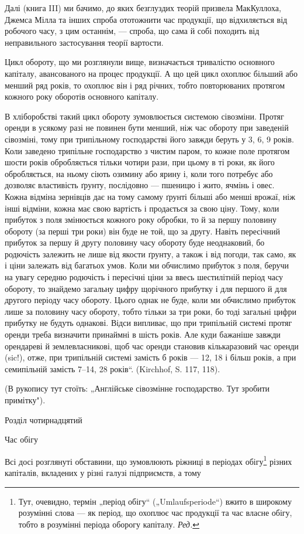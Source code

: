 Далі (книга III) ми бачимо, до яких безглуздих теорій призвела МакКуллоха,
Джемса Мілла та інших спроба ототожнити час продукції, що відхиляється від робочого часу, з
цим останнім, — спроба, що сама й собі походить від неправильного застосування теорії вартости.

Цикл обороту, що ми розглянули вище, визначається тривалістю основного капіталу, авансованого на
процес продукції. А що цей цикл охоплює більший або менший ряд років, то охоплює він і ряд річних,
тобто повторюваних протягом кожного року оборотів основного капіталу.

В хліборобстві такий цикл обороту зумовлюється системою сівозміни. Протяг оренди в усякому разі не
повинен бути менший, ніж час обороту при заведеній сівозміні, тому при трипільному господарстві його
завжди беруть у 3, 6, 9 років. Коли заведено трипільне господарство з чистим паром, то кожне поле
протягом шости років обробляється тільки чотири рази, при цьому в ті роки, як його обробляється, на
ньому сіють озимину або ярину і, коли того потребує або дозволяє властивість ґрунту, послідовно —
пшеницю і жито, ячмінь і овес. Кожна відміна зернівців дає на тому самому ґрунті більші або менші
врожаї, ніж інші відміни, кожна має свою вартість і продається за свою ціну. Тому, коли прибуток з
поля змінюється кожного року обробки, то й за першу половину обороту (за перші три роки) він буде не
той, що за другу. Навіть пересічний прибуток за першу й другу половину часу обороту буде
неоднаковий, бо родючість залежить не лише від якости ґрунту, а також і від погоди, так само, як і
ціни залежать від багатьох умов. Коли ми обчислимо прибуток з поля, беручи на увагу середню
родючість і пересічні ціни за ввесь шестилітній період часу обороту, то знайдемо загальну цифру
щорічного прибутку і для першого й для другого періоду часу обороту. Цього однак не буде, коли ми
обчислимо прибуток лише за половину часу обороту, тобто тільки за три роки, бо тоді загальні цифри
прибутку не будуть однакові. Відси випливає, що при трипільній системі протяг оренди треба визначити
принаймні в шість років. Але куди бажаніше завжди орендареві й землевласникові, щоб час оренди
становив кількаразовий час оренди (sic!), отже, при трипільній системі замість б років — 12, 18 і
більш років, а при семипільній замість 7--14, 28 років“. (Kirchhof, S. 117, 118).

(В рукопису тут стоїть: „Англійське сівозмінне господарство. Тут зробити примітку").

Розділ чотирнадцятий

Час обігу

Всі досі розглянуті обставини, що зумовлюють ріжниці в періодах обігу\footnote{
Тут, очевидно, термін „період обігу“ („Umlaufsperiode“) вжито в широкому розумінні слова — як
період, що охоплює час продукції та час власне обігу, тобто в розумінні періода оборогу капіталу.
\emph{Ред.}
} різних капіталів, вкладених у
різні галузі підприємств, а тому
\parbreak{}  %
